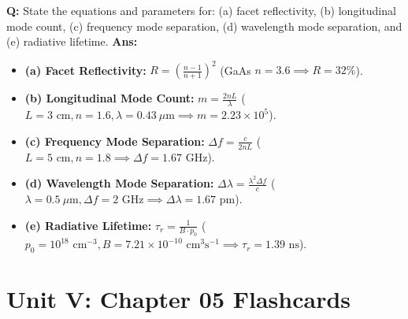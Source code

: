 \documentclass[10pt,a4paper,twocolumn]{article}
\begin{document}
\begin{tcolorbox}[
  colback=white,
  colframe=UnitColorFour,
  colbacktitle=gray!10!white,
  coltitle=black,
  fonttitle=\bfseries\sffamily\small,
  title={Unit IV $\bullet$ Card 11: Laser Cavity Numerical Formulas},
  boxrule=1.2pt,
  arc=2mm,
  outer arc=2mm,
  boxsep=1.5mm,
  top=1mm,
  bottom=1mm,
  left=1.5mm,
  right=1.5mm,
  before skip=2.5mm,
  after skip=2.5mm
]
\textbf{Q:} State the equations and parameters for: (a) facet reflectivity, (b) longitudinal mode count, (c) frequency mode separation, (d) wavelength mode separation, and (e) radiative lifetime.
\tcbline
\textbf{Ans:} \begin{itemize}
  \item   \textbf{(a) Facet Reflectivity:} $R = \left(\frac{n-1}{n+1}\right)^2$ (GaAs $n=3.6 \implies R=32\%$).
  \item   \textbf{(b) Longitudinal Mode Count:} $m = \frac{2nL}{\lambda}$ ($L=3\text{ cm}, n=1.6, \lambda=0.43\ \mu\text{m} \implies m = 2.23 \times 10^5$).
  \item   \textbf{(c) Frequency Mode Separation:} $\Delta f = \frac{c}{2nL}$ ($L=5\text{ cm}, n=1.8 \implies \Delta f = 1.67\text{ GHz}$).
  \item   \textbf{(d) Wavelength Mode Separation:} $\Delta \lambda = \frac{\lambda^2 \Delta f}{c}$ ($\lambda=0.5\ \mu\text{m}, \Delta f=2\text{ GHz} \implies \Delta \lambda = 1.67\text{ pm}$).
  \item   \textbf{(e) Radiative Lifetime:} $\tau_r = \frac{1}{B \cdot p_0}$ ($p_0=10^{18}\text{ cm}^{-3}, B=7.21 \times 10^{-10}\text{ cm}^3\text{s}^{-1} \implies \tau_r = 1.39\text{ ns}$).
\end{itemize}
\end{tcolorbox}

\section*{Unit V: Chapter 05 Flashcards}
\end{document}
